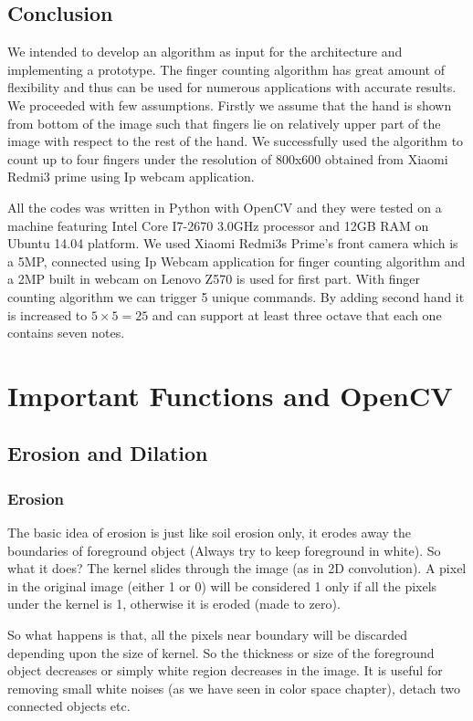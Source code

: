 \section{Conclusion}
We intended to develop an algorithm as input for the architecture and implementing a prototype. The finger counting algorithm has great amount of flexibility and thus can be used for numerous applications with accurate results. \newline We proceeded with few assumptions. Firstly we assume that the hand is shown from bottom of
the image such that fingers lie on relatively upper part of the image with respect to the rest of the
hand.
We successfully used the algorithm to count up to four fingers under the resolution of 800x600 obtained from Xiaomi Redmi3 prime using Ip webcam application. 

All the codes was written in Python with OpenCV and they were tested on a
machine featuring Intel Core I7-2670 3.0GHz processor and 12GB RAM on Ubuntu 14.04
platform. We used Xiaomi Redmi3s Prime's front camera which is a 5MP, connected using Ip Webcam application for finger counting algorithm and a 2MP built in webcam on Lenovo Z570 is used for first part.
With finger counting algorithm we can trigger 5 unique commands. By adding second hand it is increased to $5 \times 5 = 25 $ and can support at least three octave that each one contains seven notes.


\chapter{Important Functions and OpenCV}
\section{Erosion and Dilation}
\subsection{Erosion} \label{ssec:erosion}
The basic idea of erosion is just like soil erosion only, it erodes away the boundaries of foreground object (Always try to keep foreground in white). So what it does? The kernel slides through the image (as in 2D convolution). A pixel in the original image (either 1 or 0) will be considered 1 only if all the pixels under the kernel is 1, otherwise it is eroded (made to zero).

So what happens is that, all the pixels near boundary will be discarded depending upon the size of kernel. So the thickness or size of the foreground object decreases or simply white region decreases in the image. It is useful for removing small white noises (as we have seen in color space chapter), detach two connected objects etc.
